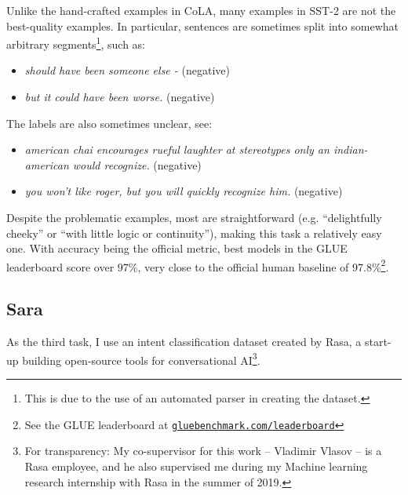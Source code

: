 \documentclass[bsc,frontabs,singlespacing,parskip,deptreport]{infthesis}
\newcommand\rurl[1]{%
  \href{https://#1}{\nolinkurl{#1}}%
}
\begin{document}
{{{      Unlike the hand-crafted examples in CoLA, many examples in SST-2 are not the best-quality examples. In particular, sentences are sometimes split into somewhat arbitrary segments\footnote{This is due to the use of an automated parser in creating the dataset.}, such as:
      \begin{itemize}
        \item \textit{should have been someone else - } (negative)
        \item \textit{but it could have been worse.} (negative)
      \end{itemize}
      
      The labels are also sometimes unclear, see:
      \begin{itemize}
        \item \textit{american chai encourages rueful laughter at stereotypes only an indian-american would recognize.} (negative)
        \item \textit{you won't like roger, but you will quickly recognize him.} (negative)
      \end{itemize}

      Despite the problematic examples, most are straightforward (e.g. ``delightfully cheeky'' or ``with little logic or continuity''), making this task a relatively easy one. With accuracy being the official metric, best models in the GLUE leaderboard score over 97\%, very close to the official human baseline of 97.8\%\footnote{See the GLUE leaderboard at \rurl{gluebenchmark.com/leaderboard}}.
    }

    \subsection{Sara}{
      \label{sec:datasets-Sara}

      As the third task, I use an intent classification dataset created by Rasa, a start-up building open-source tools for conversational AI\footnote{For transparency: My co-supervisor for this work -- Vladimir Vlasov -- is a Rasa employee, and he also supervised me during my Machine learning research internship with Rasa in the summer of 2019.}.

}}}
\end{document}
